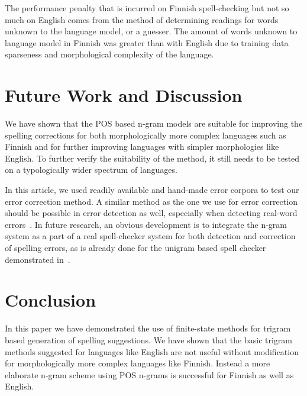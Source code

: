 \documentclass{llncs}
\begin{document}
The performance penalty that is incurred on Finnish spell-checking but not so
much on English comes from the method of determining readings for words unknown
to the language model, or a guesser. The amount of words unknown to language
model in Finnish was greater than with English due to training data sparseness
and morphological complexity of the language.

\section{Future Work and Discussion}
\label{sec:future-work}

We have shown that the POS based n-gram models are suitable for improving the
spelling corrections for both morphologically more complex languages such as
Finnish and for further improving languages with simpler morphologies like English. To
further verify the suitability of the method, it still needs to be tested on
a typologically wider spectrum of languages.

In this article, we used readily available and hand-made error corpora to test
our error correction method. A similar method as the one we use for error correction 
should be possible in error detection as well, especially when detecting real-word
errors~\cite{mays/1991}. In future research, an obvious development is to
integrate the n-gram system as a part of a real spell-checker system for both
detection and correction of spelling errors, as is already done for the
unigram based spell checker demonstrated in~\cite{pirinen/2010/lrec}.

\section{Conclusion}

In this paper we have demonstrated the use of finite-state methods for trigram
based generation of spelling suggestions. We have shown that the basic trigram
methods suggested for languages like English are not useful without
modification for morphologically more complex languages like Finnish.  Instead
a more elaborate n-gram scheme using  POS n-grams is successful for Finnish as
well as English.





\end{document}
